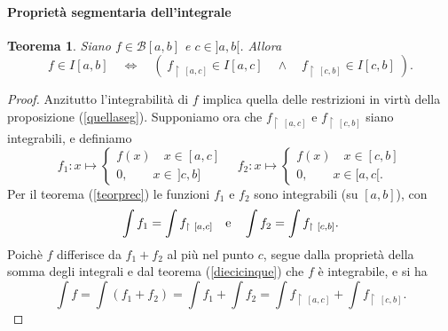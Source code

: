 \documentclass{article}
\theoremstyle{plain}
\newtheorem{thm}{Teorema}[section]
\theoremstyle{definition}
\theoremstyle{remark}
\begin{document}
\paragraph{Proprietà segmentaria dell'integrale}
\begin{bxthm}
\begin{thm}
    Siano $f\in \mathcal{B}[a,b]$ e $c\in]a,b[$.
    Allora
    \[f\in I[a,b]\quad \iff\quad (\;f_{\upharpoonright \   [a,c]}\in I[a,c]\quad\land\quad f_{\upharpoonright \   [c,b]}\in I[c,b]\;).\]
\end{thm}
\end{bxthm}
\begin{proof}
    Anzitutto l'integrabilità di $f$ implica quella delle restrizioni in virtù della proposizione (\ref{quellaseg}).
    Supponiamo ora che $f_{\upharpoonright\ [a,c]}$ e $f_{\upharpoonright\ [c,b]}$ siano integrabili, e definiamo 
    \[ f_1:x\mapsto\begin{cases}
            f(x)\quad x\in[a,c]\\
            0,\quad\quad x\in\,]c,b]
        \end{cases}\quad
        f_2:x\mapsto\begin{cases}
            f(x)\quad x\in[c,b]\\
            0,\quad\quad x\in[a,c[.
        \end{cases} \]
    Per il teorema (\ref{teorprec}) le funzioni $f_1$ e $f_2$ sono integrabili (su $[a,b]$), con
    \[ \int f_1=\int f_{\upharpoonright\ [a,c]}\quad\textup{e}\quad\int f_2=\int f_{\upharpoonright\ [c,b]}. \]
    Poichè $f$ differisce da $f_1+f_2$ al più nel punto $c$, segue dalla proprietà della somma degli integrali e dal teorema (\ref{diecicinque}) che $f$ è integrabile, e si ha
    \[\int f=\int(f_1+f_2)=\int f_1+\int f_2=\int f_{\upharpoonright\ [a,c]}+\int f_{\upharpoonright\ [c,b]}.\]
\end{proof}

\vspace{10pt}
\end{document}
